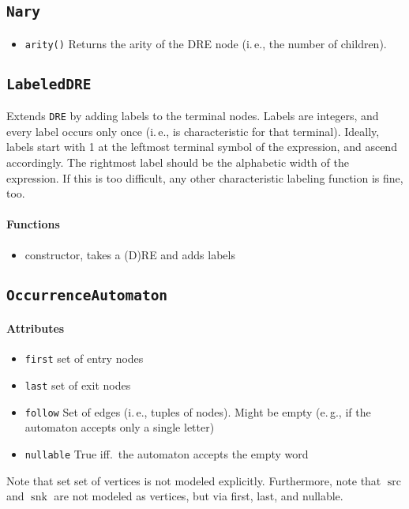 \documentclass[a4paper,11pt, svgnames,titlepage]{article}
\DeclareMathOperator{\src}{src}
\DeclareMathOperator{\snk}{snk}
\begin{document}
\subsection{\texttt{Nary}}\label{sec:des:nary}
\begin{itemize}
	\item\texttt{arity()} Returns the arity of the DRE node (i.\,e., the number of children).
\end{itemize}


\subsection{\texttt{LabeledDRE}}\label{sec:des:ldre}
Extends \texttt{DRE} by adding labels to the terminal nodes. Labels are integers, and every label occurs only once (i.\,e., is characteristic for that terminal). Ideally, labels start with 1 at the leftmost terminal symbol of the expression, and ascend accordingly. The rightmost label should be the alphabetic width of the expression. If this is too difficult, any other characteristic labeling function is fine, too.
\paragraph{Functions}
\begin{itemize}
	\item constructor, takes a (D)RE and adds labels
\end{itemize}

\subsection{\texttt{OccurrenceAutomaton}}\label{sec:des:oa}
\paragraph{Attributes}
\begin{itemize}
	\item\texttt{first} set of entry nodes
	\item\texttt{last} set of exit nodes
	\item\texttt{follow} Set of edges (i.\,e., tuples of nodes). Might be empty (e.\,g., if the automaton accepts only a single letter)
	\item\texttt{nullable} True iff.\ the automaton accepts the empty word
\end{itemize}
Note that set set of vertices is not modeled explicitly. Furthermore, note that $\src$ and $\snk$ are not modeled as vertices, but via first, last, and nullable.
\end{document}
